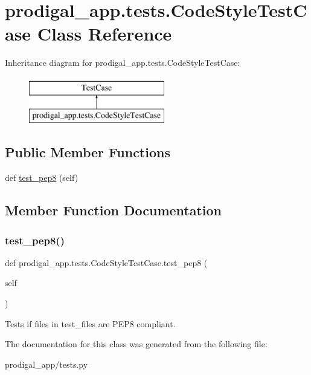 \hypertarget{classprodigal__app_1_1tests_1_1_code_style_test_case}{}\section{prodigal\+\_\+app.\+tests.\+Code\+Style\+Test\+Case Class Reference}
\label{classprodigal__app_1_1tests_1_1_code_style_test_case}
Inheritance diagram for prodigal\+\_\+app.\+tests.\+Code\+Style\+Test\+Case\+:\begin{figure}[H]
\begin{center}
\leavevmode
\includegraphics[height=2.000000cm]{classprodigal__app_1_1tests_1_1_code_style_test_case}
\end{center}
\end{figure}
\subsection*{Public Member Functions}
\begin{DoxyCompactItemize}
\item 
def \mbox{\hyperlink{classprodigal__app_1_1tests_1_1_code_style_test_case_a0981a53e6a720045f21bb7a01f60bb84}{test\+\_\+pep8}} (self)
\end{DoxyCompactItemize}


\subsection{Member Function Documentation}
\mbox{\label{classprodigal__app_1_1tests_1_1_code_style_test_case_a0981a53e6a720045f21bb7a01f60bb84}} 
\subsubsection{\texorpdfstring{test\+\_\+pep8()}{test\_pep8()}}
{\footnotesize\ttfamily def prodigal\+\_\+app.\+tests.\+Code\+Style\+Test\+Case.\+test\+\_\+pep8 (\begin{DoxyParamCaption}\item[{}]{self }\end{DoxyParamCaption})}

\begin{DoxyVerb}Tests if files in test_files are PEP8 compliant.
\end{DoxyVerb}
 

The documentation for this class was generated from the following file\+:\begin{DoxyCompactItemize}
\item 
prodigal\+\_\+app/tests.\+py\end{DoxyCompactItemize}
